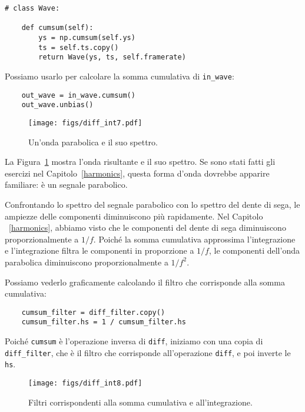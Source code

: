 \documentclass[12pt,a4paper]{book}
\begin{document}
\begin{verbatim} 
# class Wave:

    def cumsum(self):
        ys = np.cumsum(self.ys)
        ts = self.ts.copy()
        return Wave(ys, ts, self.framerate)
 \end{verbatim} 

Possiamo usarlo per calcolare la somma cumulativa di \verb"in_wave":

\begin{verbatim} 
    out_wave = in_wave.cumsum()
    out_wave.unbias()
 \end{verbatim} 

\begin{figure} 

\centerline{\texttt{[image: figs/diff\_int7.pdf]}} \caption{Un'onda parabolica e il suo spettro.} \label{fig.diff_int7} \end{figure} 

La Figura~\ref{fig.diff_int7} mostra l'onda risultante e il suo spettro. Se sono stati fatti gli esercizi nel Capitolo~\ref{harmonics}, questa forma d'onda dovrebbe apparire familiare: è un segnale parabolico.

Confrontando lo spettro del segnale parabolico con lo spettro del dente di sega, le ampiezze delle componenti diminuiscono più rapidamente. Nel Capitolo ~\ref{harmonics}, abbiamo visto che le componenti del dente di sega diminuiscono proporzionalmente a $1/f$. Poiché la somma cumulativa approssima l'integrazione e l'integrazione filtra le componenti in proporzione a $1/f$, le componenti dell'onda parabolica diminuiscono proporzionalmente a $1/f^2$.

Possiamo vederlo graficamente calcolando il filtro che corrisponde alla somma cumulativa:

\begin{verbatim} 
    cumsum_filter = diff_filter.copy()
    cumsum_filter.hs = 1 / cumsum_filter.hs
 \end{verbatim} 

Poiché {\tt cumsum} è l'operazione inversa di {\tt diff}, iniziamo con una copia di \verb"diff_filter", che è il filtro che corrisponde all'operazione {\tt diff}, e poi inverte le {\tt hs}.

\begin{figure} 

\centerline{\texttt{[image: figs/diff\_int8.pdf]}} \caption{Filtri corrispondenti alla somma cumulativa e all'integrazione.} \label{fig.diff_int8} \end{figure} 
\end{document}
